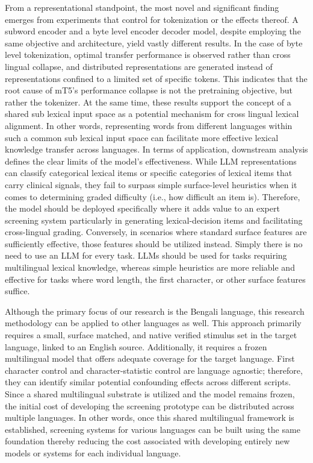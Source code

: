 \documentclass[preprint,12pt,authoryear]{elsarticle}
\begin{document}
From a representational standpoint, the most novel and significant finding emerges from experiments that control for tokenization or the effects thereof. A subword encoder and a byte level encoder decoder model, despite employing the same objective and architecture, yield vastly different results. In the case of byte level tokenization, optimal transfer performance is observed rather than cross lingual collapse, and distributed representations are generated instead of representations confined to a limited set of specific tokens. This indicates that the root cause of mT5's performance collapse is not the pretraining objective, but rather the tokenizer. At the same time, these results support the concept of a shared sub lexical input space as a potential mechanism for cross lingual lexical alignment. In other words, representing words from different languages within such a common sub lexical input space can facilitate more effective lexical knowledge transfer across languages. In terms of application, downstream analysis defines the clear limits of the model's effectiveness. While LLM representations can classify categorical lexical items or specific categories of lexical items that carry clinical signals, they fail to surpass simple surface-level heuristics when it comes to determining graded difficulty (i.e., how difficult an item is). Therefore, the model should be deployed specifically where it adds value to an expert screening system particularly in generating lexical-decision items and facilitating cross-lingual grading. Conversely, in scenarios where standard surface features are sufficiently effective, those features should be utilized instead. Simply there is no need to use an LLM for every task. LLMs should be used for tasks requiring multilingual lexical knowledge, whereas simple heuristics are more reliable and effective for tasks where word length, the first character, or other surface features suffice.

Although the primary focus of our research is the Bengali language, this research methodology can be applied to other languages as well. This approach primarily requires a small, surface matched, and native verified stimulus set in the target language, linked to an English source. Additionally, it requires a frozen multilingual model that offers adequate coverage for the target language. First character control and character-statistic control are language agnostic; therefore, they can identify similar potential confounding effects across different scripts. Since a shared multilingual substrate is utilized and the model remains frozen, the initial cost of developing the screening prototype can be distributed across multiple languages. In other words, once this shared multilingual framework is established, screening systems for various languages can be built using the same foundation thereby reducing the cost associated with developing entirely new models or systems for each individual language.
\end{document}
